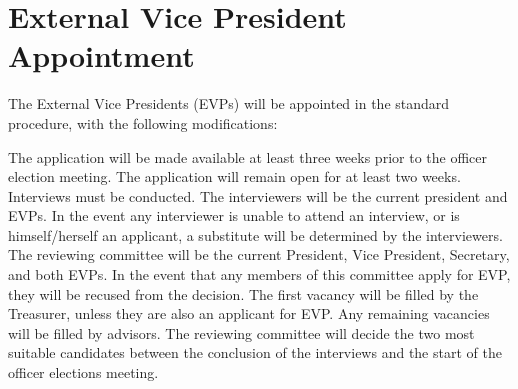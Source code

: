 \section{External Vice President Appointment} The External Vice Presidents (EVPs) will be appointed in the standard procedure, with the following modifications:
\begin{enumsubsection}
\itemnotoc The application will be made available at least three weeks prior to the officer election meeting.
\itemnotoc The application will remain open for at least two weeks.
\itemnotoc Interviews must be conducted. The interviewers will be the current president and EVPs. In the event any interviewer is unable to attend an interview, or is himself/herself an applicant, a substitute will be determined by the interviewers. 
\itemnotoc The reviewing committee will be the current President, Vice President, Secretary, and both EVPs. In the event that any members of this committee apply for EVP, they will be recused from the decision. The first vacancy will be filled by the Treasurer, unless they are also an applicant for EVP. Any remaining vacancies will be filled by advisors. 
\itemnotoc The reviewing committee will decide the two most suitable candidates between the conclusion of the interviews and the start of the officer elections meeting.
\end{enumsubsection}

